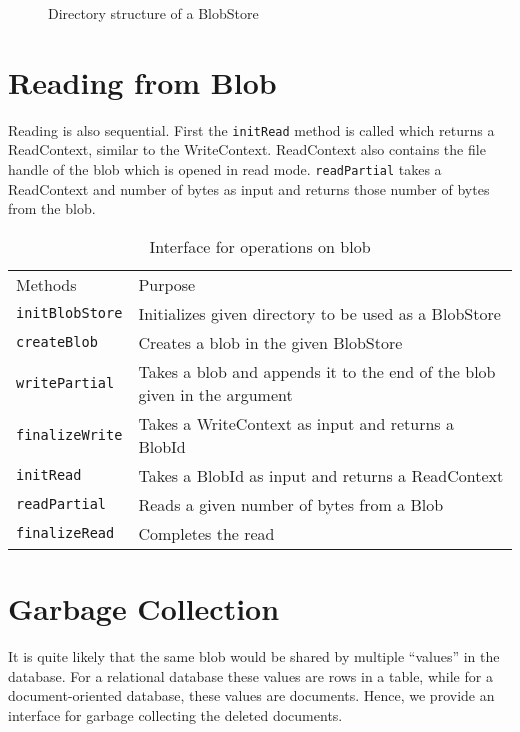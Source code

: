 \begin{figure}[hbt]
  \caption{Directory structure of a BlobStore}
  \label{fig:blobstore-dirstructure}
\end{figure}

\section{Reading from Blob}
Reading is also sequential. First the \texttt{initRead} method is called which returns a ReadContext, similar to the WriteContext. ReadContext also contains the file handle of the blob which is opened in read mode.
\texttt{readPartial} takes a ReadContext and number of bytes as input and returns those number of bytes from the blob.

\begin{table}[hbt]
\caption{Interface for operations on blob}
\label{tab:interface-blob}
\begin{center}
  \begin{tabularx}{0.91\textwidth}{lX}
    \hline\noalign{\smallskip}
    Methods & Purpose \\
    \noalign{\smallskip}
    \hline
    \noalign{\smallskip}
    \texttt{initBlobStore} & Initializes given directory to be used as a BlobStore \\
    \texttt{createBlob} & Creates a blob in the given BlobStore\\
    \texttt{writePartial} & Takes a blob and appends it to the end of the blob given in the argument\\
    \texttt{finalizeWrite} & Takes a WriteContext as input and returns a BlobId \\
    \texttt{initRead} & Takes a BlobId as input and returns a ReadContext \\
    \texttt{readPartial} & Reads a given number of bytes from a Blob \\
    \texttt{finalizeRead} & Completes the read \\
    \hline
  \end{tabularx}
\end{center}
\end{table}

\section{Garbage Collection}
It is quite likely that the same blob would be shared by multiple ``values'' in the database. For a relational database these values are rows in a table, while for a document-oriented database, these values are documents.
Hence, we provide an interface for garbage collecting the deleted documents.

